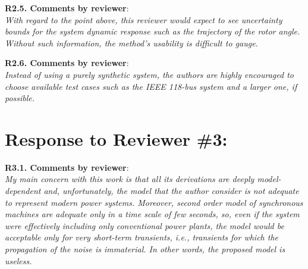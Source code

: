 \documentclass[12pt,onecolumn]{IEEEtran}
\newcommand{\blue}{\color{blue}}
\newcommand{\nib}{\noindent  {\bf Response:} }
\begin{document}
\noindent
{\bf R2.5. Comments by reviewer}:\\
{\em With regard to the point above, this reviewer would expect to see uncertainty bounds for the system dynamic response such as the trajectory of the rotor angle. Without such information, the method's usability is difficult to gauge.}

{\nib \blue{TBD.}}



\noindent
{\bf R2.6. Comments by reviewer}:\\
{\em Instead of using a purely synthetic system, the authors are highly encouraged to choose available test cases such as the IEEE 118-bus system and a larger one, if possible.}

{\nib \blue{TBD.}}



\newpage
\section*{\large \bf Response to Reviewer \#3:}

\noindent
{\bf R3.1. Comments by reviewer}:\\
{\em My main concern with this work is that all its derivations are deeply model-dependent and, unfortunately, the model that the author consider is not adequate to represent modern power systems. Moreover, second order model of synchronous machines are adequate only in a time scale of few seconds, so, even if the system were effectively including only conventional power plants, the model would be acceptable only for very short-term transients, i.e., transients for which the propagation of the noise is immaterial. In other words, the proposed model is useless.}
\end{document}
